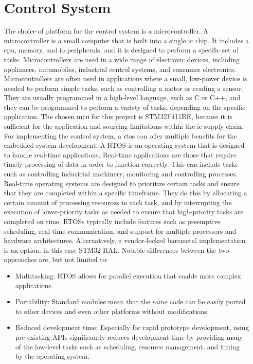 \section{Control System}
The choice of platform for the control system is a microcontroller. A microcontroller is a small computer that is built into a single \gls{ic} chip. It includes a \gls{cpu}, memory, and \gls{io} peripherals, and it is designed to perform a specific set of tasks. Microcontrollers are used in a wide range of electronic devices, including appliances, automobiles, industrial control systems, and consumer electronics. Microcontrollers are often used in applications where a small, low-power device is needed to perform simple tasks, such as controlling a motor or reading a sensor. They are usually programmed in a high-level language, such as C or C++, and they can be programmed to perform a variety of tasks, depending on the specific application. The chosen \gls{mcu} for this project is STM32F411RE, because it is sufficient for the application and sourcing limitations within the \gls{ic} supply chain. For implementing the control system, a \gls{rtos} can offer multiple benefits for the embedded system development. A RTOS is an operating system that is designed to handle real-time applications. Real-time applications are those that require timely processing of data in order to function correctly. This can include tasks such as controlling industrial machinery, monitoring and controlling processes. Real-time operating systems are designed to prioritize certain tasks and ensure that they are completed within a specific timeframe. They do this by allocating a certain amount of processing resources to each task, and by interrupting the execution of lower-priority tasks as needed to ensure that high-priority tasks are completed on time. RTOSs typically include features such as preemptive scheduling, real-time communication, and support for multiple processors and hardware architectures. Alternatively, a vendor-locked baremetal implementation is an option, in this case STM32 HAL. Notable differences between the two approaches are, but not limited to:
\begin{itemize}
	\item Multitasking: RTOS allows for parallel execution that enable more complex applications.
	\item Portability: Standard modules mean that the same code can be easily ported to other devices and even other platforms without modifications.
	\item Reduced development time: Especially for rapid prototype development, using pre-existing APIs significantly reduces development time by providing many of the low-level tasks such as scheduling, resource management, and timing by the operating system.
\end{itemize}

